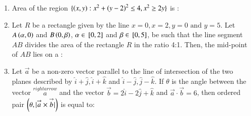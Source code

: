 \documentclass[journal,,12pt,onecolumn]{IEEEtran}
\theoremstyle{remark}
\begin{document}
\begin{enumerate}
\item Area of the region $\{\left(x,y\right):x^2+\left(y-2\right)^2 \le 4,x^2 \ge 2y\}$ is :
\begin{enumerate}
\end{enumerate}
\bigskip
\item Let $R$ be a rectangle given by the line $x=0,x=2,y=0 \text{ and } y=5$. Let $A\left(\alpha,0\right)$ and $B\left(0,\beta\right)$, $\alpha \in {}\left[0,2\right]$ and $\beta \in {}\left[0,5\right]$, be such that the line segment $AB$ divides the area of the rectangle $R$ in the ratio 4:1. Then, the mid-point of $AB$ lies on a :
\begin{enumerate}
\end{enumerate}
\bigskip 
\item Let $\overset{\rightarrow}{a}$ be a non-zero vector parallel to the line of intersection of the two planes described by $\hat{i}+\hat{j},\hat{i}+\hat{k}$ and $\hat{i}-\hat{j},\hat{j}-\hat{k}$. If $\theta$ is the angle between the vector $\overset{rightarrow}{a}$ and the vector $\overset{\rightarrow}{b}=2\hat{i}-2\hat{j}+\hat{k}$ and $\overset{\rightarrow}{a}\cdot\overset{\rightarrow}{b}=6$, then ordered pair $\left(\theta,|\overset{\rightarrow}{a}\times\overset{\rightarrow}{b}|\right)$ is equal to:
\begin{enumerate}
\end{enumerate}

\end{enumerate}
\end{document}
